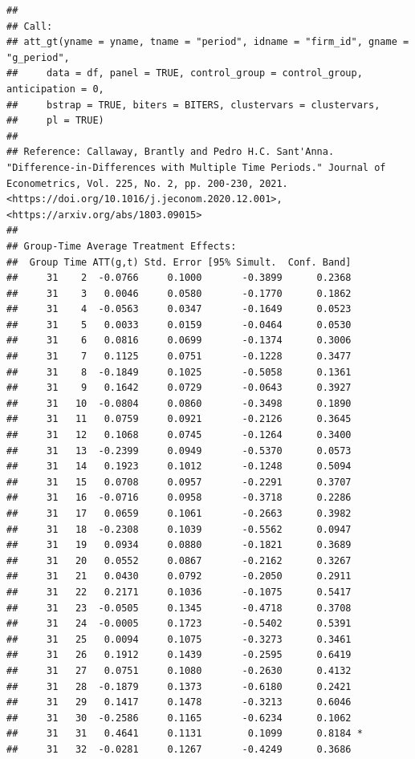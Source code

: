 \documentclass[
]{article}
\begin{document}
\begin{verbatim}
## 
## Call:
## att_gt(yname = yname, tname = "period", idname = "firm_id", gname = "g_period", 
##     data = df, panel = TRUE, control_group = control_group, anticipation = 0, 
##     bstrap = TRUE, biters = BITERS, clustervars = clustervars, 
##     pl = TRUE)
## 
## Reference: Callaway, Brantly and Pedro H.C. Sant'Anna.  "Difference-in-Differences with Multiple Time Periods." Journal of Econometrics, Vol. 225, No. 2, pp. 200-230, 2021. <https://doi.org/10.1016/j.jeconom.2020.12.001>, <https://arxiv.org/abs/1803.09015> 
## 
## Group-Time Average Treatment Effects:
##  Group Time ATT(g,t) Std. Error [95% Simult.  Conf. Band]  
##     31    2  -0.0766     0.1000       -0.3899      0.2368  
##     31    3   0.0046     0.0580       -0.1770      0.1862  
##     31    4  -0.0563     0.0347       -0.1649      0.0523  
##     31    5   0.0033     0.0159       -0.0464      0.0530  
##     31    6   0.0816     0.0699       -0.1374      0.3006  
##     31    7   0.1125     0.0751       -0.1228      0.3477  
##     31    8  -0.1849     0.1025       -0.5058      0.1361  
##     31    9   0.1642     0.0729       -0.0643      0.3927  
##     31   10  -0.0804     0.0860       -0.3498      0.1890  
##     31   11   0.0759     0.0921       -0.2126      0.3645  
##     31   12   0.1068     0.0745       -0.1264      0.3400  
##     31   13  -0.2399     0.0949       -0.5370      0.0573  
##     31   14   0.1923     0.1012       -0.1248      0.5094  
##     31   15   0.0708     0.0957       -0.2291      0.3707  
##     31   16  -0.0716     0.0958       -0.3718      0.2286  
##     31   17   0.0659     0.1061       -0.2663      0.3982  
##     31   18  -0.2308     0.1039       -0.5562      0.0947  
##     31   19   0.0934     0.0880       -0.1821      0.3689  
##     31   20   0.0552     0.0867       -0.2162      0.3267  
##     31   21   0.0430     0.0792       -0.2050      0.2911  
##     31   22   0.2171     0.1036       -0.1075      0.5417  
##     31   23  -0.0505     0.1345       -0.4718      0.3708  
##     31   24  -0.0005     0.1723       -0.5402      0.5391  
##     31   25   0.0094     0.1075       -0.3273      0.3461  
##     31   26   0.1912     0.1439       -0.2595      0.6419  
##     31   27   0.0751     0.1080       -0.2630      0.4132  
##     31   28  -0.1879     0.1373       -0.6180      0.2421  
##     31   29   0.1417     0.1478       -0.3213      0.6046  
##     31   30  -0.2586     0.1165       -0.6234      0.1062  
##     31   31   0.4641     0.1131        0.1099      0.8184 *
##     31   32  -0.0281     0.1267       -0.4249      0.3686  

\end{verbatim}
\end{document}
